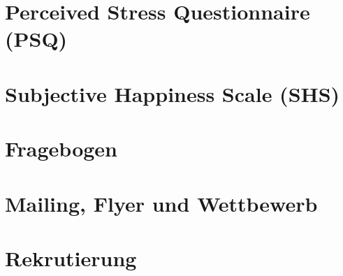 \section{Perceived Stress Questionnaire (PSQ)}\label{app:PSQ}

\newpage

\section{Subjective Happiness Scale (SHS)}\label{app:SHS}

\newpage

\section{Fragebogen}\label{app:Fragebogen}

\newpage

\section{Mailing, Flyer und Wettbewerb}\label{app:Mailing}

\newpage

\section{Rekrutierung}\label{app:Rekrutierung}

\newpage





%
%
%
